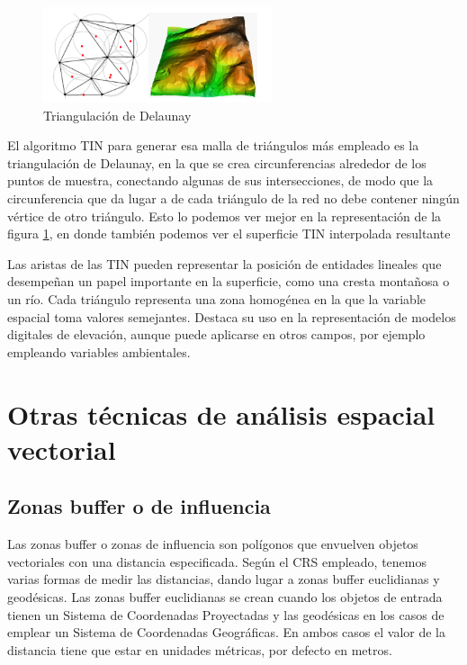 \begin{itemize}
    \begin{figure}[H]
        \centering
        \includegraphics[width=0.60\textwidth]{Imagenes/analisis/TIN.png}
        \caption{Triangulación de Delaunay} \label{fig:tin}
    \end{figure}

    El algoritmo TIN para generar esa malla de triángulos más empleado es la triangulación de Delaunay, 
    en la que se crea circunferencias alrededor de los puntos de muestra, conectando algunas de sus intersecciones, de modo que la circunferencia que da lugar a de cada triángulo de la red no debe contener ningún vértice de otro triángulo. 
    Esto lo podemos ver mejor en la representación de la figura \ref{fig:tin}, en donde también podemos ver el superficie TIN interpolada resultante
    
    Las aristas de las TIN pueden representar la posición de entidades lineales que desempeñan un papel importante en la superficie, como una cresta montañosa o un río.
    Cada triángulo representa una zona homogénea en la que la variable espacial toma valores semejantes. 
    Destaca su uso en la representación de modelos digitales de elevación, aunque puede aplicarse en otros campos, por ejemplo empleando variables ambientales.
\end{itemize}

\section{Otras técnicas de análisis espacial vectorial}

\subsection{Zonas buffer o de influencia}

Las zonas buffer o zonas de influencia son polígonos que envuelven objetos vectoriales con una distancia especificada.
Según el CRS empleado, tenemos varias formas de medir las distancias, dando lugar a zonas buffer euclidianas y geodésicas.
Las zonas buffer euclidianas se crean cuando los objetos de entrada tienen un Sistema de Coordenadas Proyectadas y las geodésicas en los casos de emplear un Sistema de Coordenadas Geográficas.
En ambos casos el valor de la distancia tiene que estar en unidades métricas, por defecto en metros.

